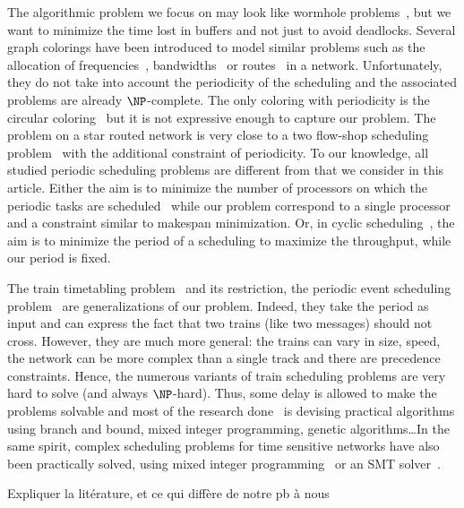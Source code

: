The algorithmic problem we focus on may look like wormhole problems~\cite{cole1996benefit}, but we want to minimize the time lost in buffers and not just to avoid deadlocks. Several graph colorings have been introduced to model similar problems such as the allocation of frequencies~\cite{borndorfer1998frequency}, bandwidths~\cite{erlebach2001complexity} or routes~\cite{cole1996benefit} in a network. Unfortunately, they do not take into account the periodicity of the scheduling and the associated problems are already $\NP$-complete. The only coloring with periodicity is the circular coloring~\cite{zhou2013multiple} but it is not expressive enough to capture our problem. 
The problem \pall on a star routed network is very close to a two flow-shop scheduling problem~\cite{yu2004minimizing} with the additional constraint of periodicity. To our knowledge, all studied periodic scheduling problems are different from \pall that we consider in this article. 
Either the aim is to minimize the number of processors on which the periodic tasks are scheduled~\cite{korst1991periodic,hanen1993cyclic} while our problem correspond to a single processor and a constraint similar to makespan minimization. Or, in cyclic scheduling~\cite{levner2010complexity}, the aim is to minimize the period of a scheduling to maximize the throughput, while our period is fixed. 

The train timetabling problem~\cite{lusby2011railway} and its restriction, the periodic event scheduling problem~\cite{serafini1989mathematical} are generalizations of our problem. Indeed, they take the period as input and can express the fact that two trains (like two messages) should not cross. However, they are much more general: the trains can vary in size, speed, the network can be more complex than a single track and there are precedence constraints. Hence, the numerous variants of train scheduling problems are very hard to solve (and always $\NP$-hard). Thus, some delay is allowed to make the problems solvable and most of the research done~\cite{lusby2011railway} is devising practical algorithms using branch and bound, mixed integer programming, genetic algorithms\dots  In the same spirit, complex scheduling problems for time sensitive networks have also been practically solved, using mixed integer programming~\cite{nayak2017incremental,steiner2018traffic} or an SMT solver~\cite{dos2019tsnsched}.



Expliquer la litérature, et ce qui diffère de notre pb à nous